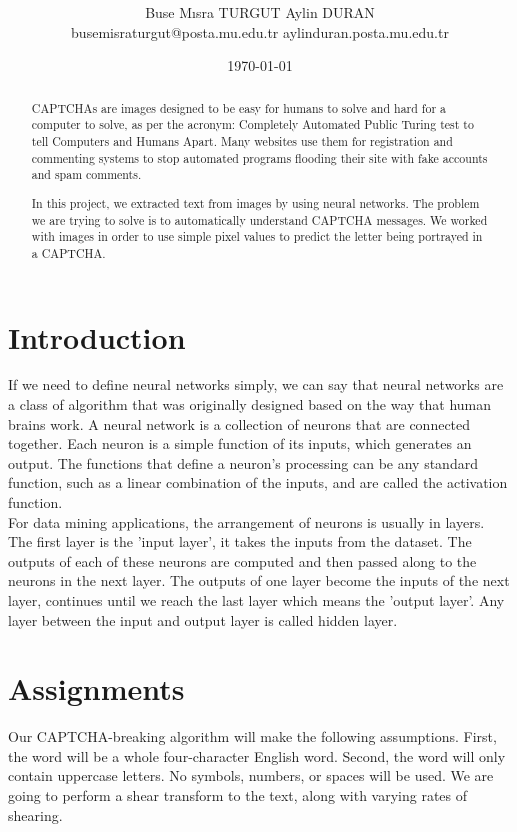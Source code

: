 \documentclass[onecolumn]{article}
\title{\spacecaps{Project Report: Solving CAPTCHA's}\\ 
\normalsize \spacesc{CENG 3521, DATA MINING} }
\author{Buse Mısra TURGUT     Aylin DURAN\\
busemisraturgut@posta.mu.edu.tr   aylinduran.posta.mu.edu.tr}
\date{\today}
\begin{document}
\maketitle

\begin{abstract}
CAPTCHAs are images designed to be easy for humans to solve and hard for a computer to solve, as per the acronym: Completely Automated Public Turing test to tell Computers and Humans Apart. Many websites use them for registration and commenting systems to stop automated programs flooding their site with fake accounts and spam comments.

In this project, we extracted text from images by using neural networks. The problem we are trying to solve is to automatically understand CAPTCHA messages. We worked with images in order to use simple pixel values to predict the letter being portrayed in a CAPTCHA.
\end{abstract}


\section{Introduction}
If  we  need to define neural networks simply, we can say that neural networks are a
class of algorithm that was originally designed based on the way that human brains work. A neural network is a collection of neurons that are connected together. Each neuron is a simple function of its inputs, which generates an output. The functions that define a neuron's processing can be any standard function, such as a linear combination of the inputs, and are called the activation function.\\
For data mining applications, the arrangement of neurons is usually in layers. The
first layer is the 'input layer', it takes the inputs from the dataset. The outputs of each
of these neurons are computed and then passed along to the neurons in the next
layer. The outputs of one layer become the inputs of the next layer, continues until we
reach the last layer which means the 'output layer'. Any layer between the input and output layer is called hidden layer. 


\section{Assignments}
Our CAPTCHA-breaking algorithm will make the following assumptions. First, the
word will be a whole four-character English word. Second, the word will only contain
uppercase letters. No symbols, numbers, or spaces will be used.  We are going to perform a shear transform to the text, along with varying rates of shearing.
\end{document}
